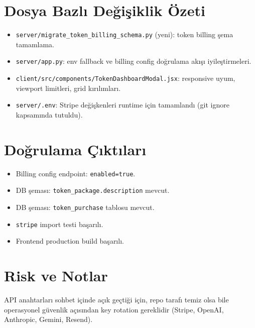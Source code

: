 \documentclass[12pt,a4paper]{article}
\begin{document}
\section{Dosya Bazlı Değişiklik Özeti}

\begin{itemize}[leftmargin=*, label=\textbullet]
	\item \texttt{server/migrate\_token\_billing\_schema.py} (yeni):
	token billing şema tamamlama.
	\item \texttt{server/app.py}: env fallback ve billing config doğrulama akışı iyileştirmeleri.
	\item \texttt{client/src/components/TokenDashboardModal.jsx}:
	responsive uyum, viewport limitleri, grid kırılımları.
	\item \texttt{server/.env}: Stripe değişkenleri runtime için tamamlandı
	(git ignore kapsamında tutuldu).
\end{itemize}

\section{Doğrulama Çıktıları}

\begin{tcolorbox}[colback=green!5,colframe=successgreen,title={Başarılı Kontroller}]
\begin{itemize}[leftmargin=*, nosep]
	\item Billing config endpoint: \texttt{enabled=true}.
	\item DB şeması: \texttt{token\_package.description} mevcut.
	\item DB şeması: \texttt{token\_purchase} tablosu mevcut.
	\item \texttt{stripe} import testi başarılı.
	\item Frontend production build başarılı.
\end{itemize}
\end{tcolorbox}

\section{Risk ve Notlar}

\begin{tcolorbox}[colback=yellow!10,colframe=warningorange,title={Güvenlik Notu}]
API anahtarları sohbet içinde açık geçtiği için, repo tarafı temiz olsa bile
operasyonel güvenlik açısından key rotation gereklidir (Stripe, OpenAI,
Anthropic, Gemini, Resend).
\end{tcolorbox}
\end{document}
